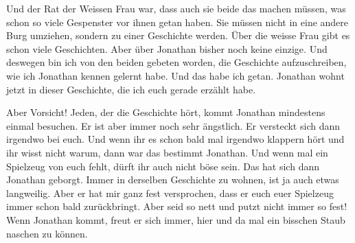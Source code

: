\begin{mdframed}[style=mystyle]
Und der Rat der Weissen Frau war, dass auch sie beide das machen müssen, was schon so viele Gespenster vor ihnen getan haben. Sie müssen nicht in eine andere Burg umziehen, sondern zu einer Geschichte werden. Über die weisse Frau gibt es schon viele Geschichten. Aber über Jonathan bisher noch keine einzige. Und deswegen bin ich von den beiden gebeten worden, die Geschichte aufzuschreiben, wie ich Jonathan kennen gelernt habe. Und das habe ich getan. Jonathan wohnt jetzt in dieser Geschichte, die ich euch gerade erzählt habe. 

Aber Vorsicht! Jeden, der die Geschichte hört, kommt Jonathan mindestens einmal besuchen. Er ist aber immer noch sehr ängstlich. Er versteckt sich dann irgendwo bei euch. Und wenn ihr es schon bald mal irgendwo klappern hört und ihr wisst nicht warum, dann war das bestimmt Jonathan. Und wenn mal ein Spielzeug von euch fehlt, dürft ihr auch nicht böse sein. Das hat sich dann Jonathan geborgt. Immer in derselben Geschichte zu wohnen, ist ja auch etwas langweilig. Aber er hat mir ganz fest versprochen, dass er euch euer Spielzeug immer schon bald zurückbringt. Aber seid so nett und putzt nicht immer so fest! Wenn Jonathan kommt, freut er sich immer, hier und da mal ein bisschen Staub naschen zu können. \hfill {\color{red}\decofourleft}
\end{mdframed}

